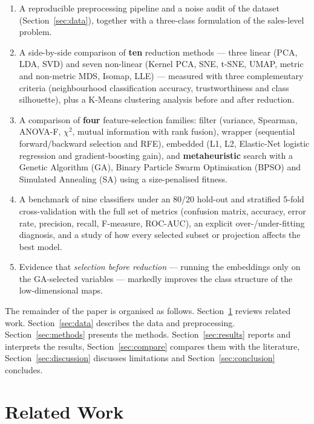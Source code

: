 \begin{enumerate}
  \item A reproducible preprocessing pipeline and a noise audit of the dataset (Section~\ref{sec:data}), together with a three-class formulation of the sales-level problem.
  \item A side-by-side comparison of \textbf{ten} reduction methods --- three linear (PCA, LDA, SVD) and seven non-linear (Kernel PCA, SNE, t-SNE, UMAP, metric and non-metric MDS, Isomap, LLE) --- measured with three complementary criteria (neighbourhood classification accuracy, trustworthiness and class silhouette), plus a K-Means clustering analysis before and after reduction.
  \item A comparison of \textbf{four} feature-selection families: filter (variance, Spearman, ANOVA-F, $\chi^2$, mutual information with rank fusion), wrapper (sequential forward/backward selection and RFE), embedded (L1, L2, Elastic-Net logistic regression and gradient-boosting gain), and \textbf{metaheuristic} search with a Genetic Algorithm (GA), Binary Particle Swarm Optimisation (BPSO) and Simulated Annealing (SA) using a size-penalised fitness.
  \item A benchmark of nine classifiers under an 80/20 hold-out and stratified 5-fold cross-validation with the full set of metrics (confusion matrix, accuracy, error rate, precision, recall, F-measure, ROC-AUC), an explicit over-/under-fitting diagnosis, and a study of how every selected subset or projection affects the best model.
  \item Evidence that \emph{selection before reduction} --- running the embeddings only on the GA-selected variables --- markedly improves the class structure of the low-dimensional maps.
\end{enumerate}

The remainder of the paper is organised as follows. Section~\ref{sec:related} reviews related work. Section~\ref{sec:data} describes the data and preprocessing. Section~\ref{sec:methods} presents the methods. Section~\ref{sec:results} reports and interprets the results, Section~\ref{sec:compare} compares them with the literature, Section~\ref{sec:discussion} discusses limitations and Section~\ref{sec:conclusion} concludes.

\section{Related Work}\label{sec:related}

